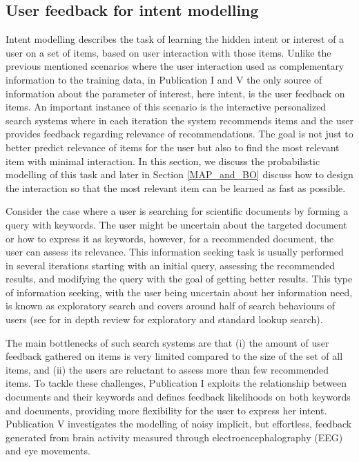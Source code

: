 \documentclass[dissertation,math,vertlayout,pdfa,colorlinks]{aaltoseries}
\begin{document}
\subsection{User feedback for intent modelling}\label{feedback_intent_modelling}

Intent modelling describes the task of learning the hidden intent or interest of a user on a set of items, based on user interaction with those items. Unlike the previous mentioned scenarios where the user interaction used as complementary information to the training data, in Publication I and V the only source of information about the parameter of interest, here intent, is the user feedback on items. An important instance of this scenario is the interactive personalized search systems where in each iteration the system recommends items and the user provides feedback regarding relevance of recommendations. The goal is not just to better predict relevance of items for the user but also to find the most relevant item with minimal interaction. In this section, we discuss the probabilistic modelling of this task and later in Section \ref{MAP_and_BO} discuss how to design the interaction so that the most relevant item can be learned as fast as possible. 

Consider the case where a user is searching for scientific documents by forming a query with keywords. The user might be uncertain about the targeted document or how to express it as keywords, however, for a recommended document, the user can assess its relevance. This information seeking task is usually performed in several iterations starting with an initial query, assessing the recommended results, and modifying the query with the goal of getting better results. This type of information seeking, with the user being uncertain about her information need, is known as exploratory search \cite{Marchionini2006,white2009exploratory} and covers around half of search behaviours of users \cite{Teevan_2004} (see \cite{paba_exploratory_vs_lookup} for in depth review for exploratory and standard lookup search). 

The main bottlenecks of such search systems are that (i) the amount of user feedback gathered on items is very limited compared to the size of the set of all items, and (ii) the users are reluctant to assess more than few recommended items. To tackle these challenges, Publication I exploits the relationship between documents and their keywords and defines feedback likelihoods on both keywords and documents, providing more flexibility for the user to express her intent. Publication V investigates the modelling of noisy implicit, but effortless, feedback generated from brain activity measured through electroencephalography (EEG) and eye movements.  
\end{document}
